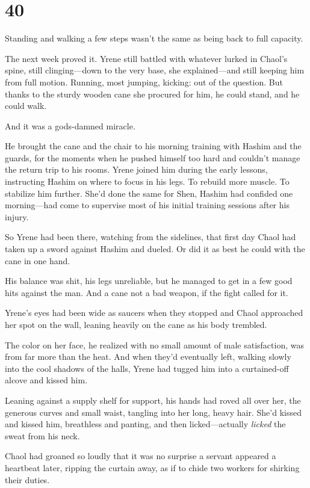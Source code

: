 
\chapter{40}

Standing and walking a few steps wasn't the same as being back to full capacity.

The next week proved it. Yrene still battled with whatever lurked in Chaol's spine, still clinging---down to the very base, she explained---and still keeping him from full motion. Running, most jumping, kicking: out of the question. But thanks to the sturdy wooden cane she procured for him, he could stand, and he could walk.

And it was a gods-damned miracle.

He brought the cane and the chair to his morning training with Hashim and the guards, for the moments when he pushed himself too hard and couldn't manage the return trip to his rooms. Yrene joined him during the early lessons, instructing Hashim on where to focus in his legs. To rebuild more muscle. To stabilize him further. She'd done the same for Shen, Hashim had confided one morning---had come to supervise most of his initial training sessions after his injury.

So Yrene had been there, watching from the sidelines, that first day Chaol had taken up a sword against Hashim and dueled. Or did it as best he could with the cane in one hand.

His balance was shit, his legs unreliable, but he managed to get in a few good hits against the man. And a cane  not a bad weapon, if the fight called for it.

Yrene's eyes had been wide as saucers when they stopped and Chaol approached her spot on the wall, leaning heavily on the cane as his body trembled.

The color on her face, he realized with no small amount of male satisfaction, was from far more than the heat. And when they'd eventually left, walking slowly into the cool shadows of the halls, Yrene had tugged him into a curtained-off alcove and kissed him.

Leaning against a supply shelf for support, his hands had roved all over her, the generous curves and small waist, tangling into her long, heavy hair. She'd kissed and kissed him, breathless and panting, and then licked---actually \emph{licked} the sweat from his neck.

Chaol had groaned so loudly that it was no surprise a servant appeared a heartbeat later, ripping the curtain away, as if to chide two workers for shirking their duties.

